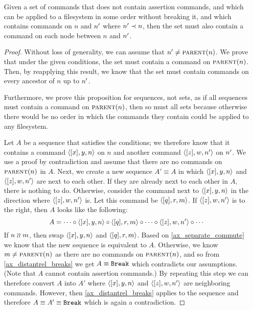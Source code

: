 \begin{mylem}\label{connected_changes}
Given a set of commands that
does not contain assertion commands,
and which can be applied to a filesystem in some order without breaking it,
and which contains commands on $n$ and $n'$ where $n'\prec n$,
then the set must also contain a command
on each node between $n$ and $n'$.
\end{mylem}
\begin{proof}
Without loss of generality, we can assume that $n'\neq\text{\normalfont\scshape{parent}}(n)$.
We prove that under the given conditions, the set must contain a command on $\text{\normalfont\scshape{parent}}(n)$.
Then, by reapplying this result, we know that the set must contain commands on every
ancestor of $n$ up to $n'$.

Furthermore,
we prove this proposition for sequences, not sets, as if all sequences must contain a command on $\text{\normalfont\scshape{parent}}(n)$,
then so must all sets because otherwise there would be no order in which the commands they contain could be
applied to any filesystem.

Let $A$ be a sequence that satisfies the conditions;
we therefore know that it contains a command $\langle{[x],y,n}\rangle$ on $n$
and another command $\langle{[z],w,n'}\rangle$ on $n'$.
We use a proof by contradiction and assume that there are no commands on $\text{\normalfont\scshape{parent}}(n)$ in $A$.
Next, we create a new sequence $A'\equiv A$ in which $\langle{[x],y,n}\rangle$ and $\langle{[z],w,n'}\rangle$ are next to each other.
If they are already next to each other in $A$, there is nothing to do.
Otherwise, consider the command next to $\langle{[x],y,n}\rangle$ in the direction where $\langle{[z],w,n'}\rangle$ is.
Let this command be $\langle{[q],r,m}\rangle$.
If $\langle{[z],w,n'}\rangle$ is to the right, then $A$ looks like the following:
\[ A = \cdots\circ\langle{[x],y,n}\rangle\circ\langle{[q],r,m}\rangle\circ\cdots\circ\langle{[z],w,n'}\rangle\circ\cdots \]
If $n\mathrel{\wr\wr} m$, then swap $\langle{[x],y,n}\rangle$ and $\langle{[q],r,m}\rangle$. Based on \cref{ax_separate_commute} we know that the new
sequence is equivalent to $A$.
Otherwise, we know $m\neq\text{\normalfont\scshape{parent}}(n)$ as there are no commands on $\text{\normalfont\scshape{parent}}(n)$, and so
from \cref{ax_distantrel_breaks} we get $A\equiv\mathtt{Break}$ which contradicts our assumptions.
(Note that $A$ cannot contain assertion commands.)
By repeating this step we can therefore convert $A$ into $A'$ where $\langle{[x],y,n}\rangle$ and $\langle{[z],w,n'}\rangle$ are neighboring commands.
However, then \cref{ax_distantrel_breaks} applies to the sequence and therefore $A\equiv A'\equiv\mathtt{Break}$ which
is again a contradiction.
\end{proof}



